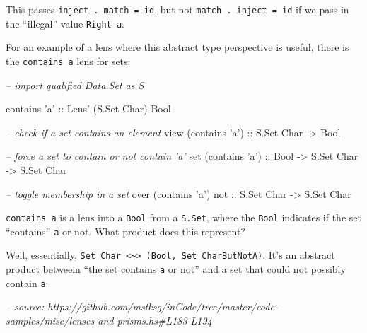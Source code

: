 \documentclass[]{article}
\newenvironment{Shaded}{}{}
\newcommand{\CharTok}[1]{\textcolor[rgb]{0.25,0.44,0.63}{#1}}
\newcommand{\CommentTok}[1]{\textcolor[rgb]{0.38,0.63,0.69}{\textit{#1}}}
\newcommand{\DataTypeTok}[1]{\textcolor[rgb]{0.56,0.13,0.00}{#1}}
\newcommand{\NormalTok}[1]{#1}
\newcommand{\OtherTok}[1]{\textcolor[rgb]{0.00,0.44,0.13}{#1}}
\begin{document}
\begin{enumerate}
  This passes \texttt{inject\ .\ match\ =\ id}, but not
  \texttt{match\ .\ inject\ =\ id} if we pass in the ``illegal'' value
  \texttt{Right\ \textquotesingle{}a\textquotesingle{}}.

  For an example of a lens where this abstract type perspective is useful, there
  is the \texttt{contains\ \textquotesingle{}a\textquotesingle{}} lens for sets:

\begin{Shaded}
\begin{Highlighting}[]
\CommentTok{-- import qualified Data.Set as S}

\NormalTok{contains }\CharTok{'a'}\OtherTok{ ::} \DataTypeTok{Lens'}\NormalTok{ (}\DataTypeTok{S.Set} \DataTypeTok{Char}\NormalTok{) }\DataTypeTok{Bool}

\CommentTok{-- check if a set contains an element}
\NormalTok{view (contains }\CharTok{'a'}\NormalTok{)}\OtherTok{ ::} \DataTypeTok{S.Set} \DataTypeTok{Char} \OtherTok{->} \DataTypeTok{Bool}

\CommentTok{-- force a set to contain or not contain 'a'}
\NormalTok{set (contains }\CharTok{'a'}\NormalTok{)}\OtherTok{ ::} \DataTypeTok{Bool} \OtherTok{->} \DataTypeTok{S.Set} \DataTypeTok{Char} \OtherTok{->} \DataTypeTok{S.Set} \DataTypeTok{Char}

\CommentTok{-- toggle membership in a set}
\NormalTok{over (contains }\CharTok{'a'}\NormalTok{)}\OtherTok{ not ::} \DataTypeTok{S.Set} \DataTypeTok{Char} \OtherTok{->} \DataTypeTok{S.Set} \DataTypeTok{Char}
\end{Highlighting}
\end{Shaded}

  \texttt{contains\ \textquotesingle{}a\textquotesingle{}} is a lens into a
  \texttt{Bool} from a \texttt{S.Set}, where the \texttt{Bool} indicates if the
  set ``contains'' \texttt{a} or not. What product does this represent?

  Well, essentially,
  \texttt{Set\ Char\ \textless{}\textasciitilde{}\textgreater{}\ (Bool,\ Set\ CharButNotA)}.
  It's an abstract product betweein ``the set contains
  \texttt{\textquotesingle{}a\textquotesingle{}} or not'' and a set that could
  not possibly contain \texttt{\textquotesingle{}a\textquotesingle{}}:

\begin{Shaded}
\begin{Highlighting}[]
\CommentTok{-- source: https://github.com/mstksg/inCode/tree/master/code-samples/misc/lenses-and-prisms.hs#L183-L194}


\end{Highlighting}
\end{Shaded}
\end{enumerate}
\end{document}
